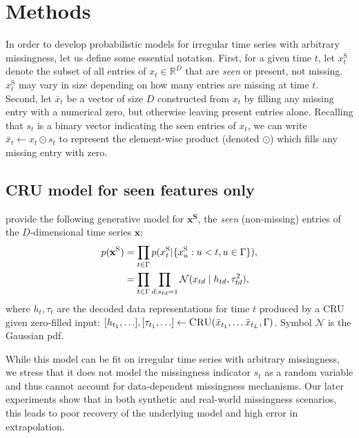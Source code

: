\newcommand{\xseen}{x^{\text{S}}}
\newcommand{\xfillzero}{\bar{x}}

\section{Methods}
In order to develop probabilistic models for irregular time series with arbitrary missingness, let us define some essential notation. First, for a given time $t$, let $\xseen_t$ denote the subset of all entries of $x_{t} \in \mathbb{R}^D$ that are \emph{seen} or present, not missing. $\xseen_t$ may vary in size depending on how many entries are missing at time $t$.  Second, let $\bar{x}_{t}$ be a vector of size $D$ constructed from $x_t$ by filling any missing entry with a numerical zero, but otherwise leaving present entries alone. Recalling that $s_t$ is a binary vector indicating the seen entries of $x_t$, we can write $\xfillzero_t \gets x_{t} \odot s_{t}$ to represent the element-wise product (denoted $\odot$) which fills any missing entry with zero.


\subsection{CRU model for seen features only}
\label{sec:CRU_gen_model_from_prev_work}

\citet{schirmer2022modeling} provide the following generative model for $\mathbf{\xseen}$, the \emph{seen} (non-missing) entries of the $D$-dimensional time series $\mathbf{x}$:
\begin{align}
    p( \mathbf{\xseen} ) &= \prod_{t \in \Gamma} p( \xseen_t | \{  \xseen_u : u < t, u \in \Gamma \} ),
    \\ \notag 
    &= \prod_{t \in \Gamma} \prod_{d : s_{td}=1} \mathcal{N}( x_{td} \mid h_{td}, \tau_{td}^2 ),
\end{align}
where $h_t, \tau_t$ are the decoded data representations for time $t$ produced by a CRU given zero-filled input:  $[h_{t_1}, \ldots], [\tau_{t_1}, \ldots] \gets \textsc{CRU}( \bar{x}_{t_1}, \ldots \bar{x}_{t_L}, \Gamma )$. Symbol $\mathcal{N}$ is the Gaussian pdf.

While this model can be fit on irregular time series with arbitrary missingness, we stress that it does not model the missingness indicator $s_t$ as a random variable and thus cannot account for data-dependent missingness mechanisms. Our later experiments show that in both synthetic  and real-world missingness scenarios, this leads to poor recovery of the underlying model and high error in extrapolation.

